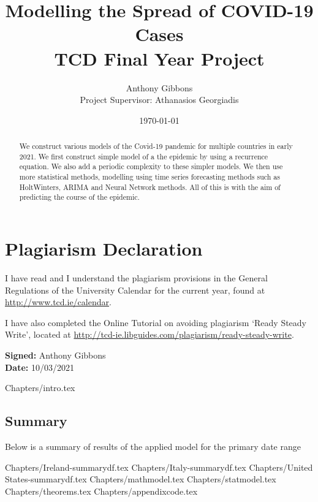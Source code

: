 \documentclass[a4paper]{article}
\title{Modelling the Spread of COVID-19 Cases \\ \large{TCD Final Year Project}}
\author{Anthony Gibbons \\  \normalsize{Project Supervisor: Athanasios Georgiadis}}
\date{\today}
\begin{document}
\maketitle      
\renewcommand\lstlistlistingname{List of Code}

\begin{abstract}
    We construct various models of the Covid-19 pandemic for multiple countries in early 2021. We first construct simple model of a the epidemic by using a recurrence equation. We also add a periodic complexity to these simpler models. We then use more statistical methods, modelling using time series forecasting methods such as HoltWinters, ARIMA and Neural Network methods. All of this is with the aim of predicting the course of the epidemic.
\end{abstract}
\pagebreak
\section*{Plagiarism Declaration}
I have read and I understand the plagiarism provisions in the General
Regulations of the University Calendar for the current year, found at
\url{http://www.tcd.ie/calendar}.

I have also completed the Online Tutorial on avoiding plagiarism
‘Ready Steady Write’, located at
\url{http://tcd-ie.libguides.com/plagiarism/ready-steady-write}.

\textbf{Signed:} Anthony Gibbons \\
\textbf{Date:} 10/03/2021
\pagebreak

\hypersetup{
    linkcolor=black,
}

\tableofcontents \pagebreak

\listoffigures \pagebreak

\lstlistoflistings \pagebreak

\listoftables \pagebreak

{Chapters/intro.tex}

\subsection{Summary}
Below is a summary of results of the applied model for the primary date range

{Chapters/Ireland-summarydf.tex}
{Chapters/Italy-summarydf.tex}
{Chapters/United States-summarydf.tex}
\pagebreak
{Chapters/mathmodel.tex}
\pagebreak
{Chapters/statmodel.tex}
\pagebreak
\appendix
{Chapters/theorems.tex}
\pagebreak
{Chapters/appendixcode.tex}
\pagebreak 
\printbibliography
\end{document}
